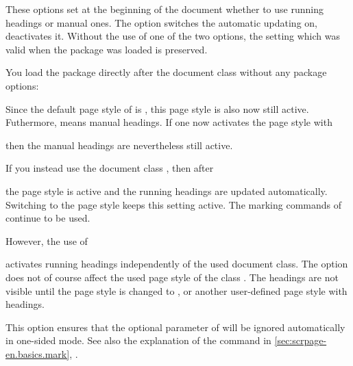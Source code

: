 \begin{Declaration}
\end{Declaration}%
%
%
These options set at the beginning of the document whether to use running
headings or manual ones.  The option  switches the automatic
updating on,  deactivates it.  Without the use of one of
the two options, the setting which was valid when the package was loaded is
preserved.
%
\begin{Example}
  You load the package  directly after the document class
   without any package options:
  Since the default page style of  is ,
  this page style is also now still active.  Futhermore, 
  means manual headings.  If one now activates the page style
   with
\begin{lstcode}
  \pagestyle{scrheadings}
\end{lstcode}
  then the manual headings are nevertheless still active.

  If you instead use the document class , then after
  the page style  is active and the running headings are
  updated automatically.  Switching to the page style
   keeps this setting active.  The marking commands
  of  continue to be used.

  However, the use of
\begin{lstcode}
  \usepackage[automark]{scrpage2}
\end{lstcode}
  activates running headings independently of the used document class.
  The option does not of course affect the used page style 
  of the class . The headings are not visible until the
  page style is changed to
  , 
  or another user-defined page style with headings.%
\end{Example}%
\EndIndexGroup


\begin{Declaration}
\end{Declaration}%
%
%
This option ensures that the optional parameter of
 will be ignored automatically in
one-sided mode. See also the explanation of the command
 in \autoref{sec:scrpage-en.basics.mark},
.%
%
\EndIndexGroup


